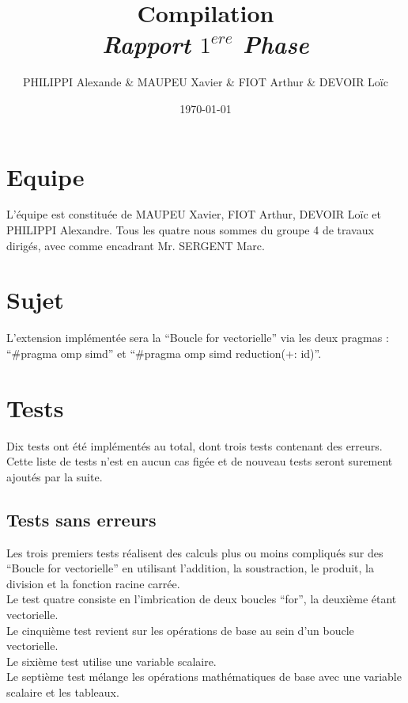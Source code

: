 \documentclass[a4paper,8pt,french,fleqn]{report}
\title{\textbf{Compilation}\\\textit{Rapport $1^{ere}$ Phase}}
\author{PHILIPPI Alexande \& MAUPEU Xavier \& FIOT Arthur \& DEVOIR Loïc}
\date{\today}
\begin{document}
\maketitle

\newpage

\section*{Equipe}

L'équipe est constituée de MAUPEU Xavier, FIOT Arthur, DEVOIR Loïc et PHILIPPI Alexandre. Tous les quatre nous sommes du groupe 4 de travaux dirigés, avec comme encadrant Mr. SERGENT Marc.

\section*{Sujet}

L'extension implémentée sera la ``Boucle for vectorielle'' via les deux pragmas : ``\#pragma omp simd'' et ``\#pragma omp simd reduction(+: id)''.

\section*{Tests}

Dix tests ont été implémentés au total, dont trois tests contenant des erreurs. Cette liste de tests n'est en aucun cas figée et de nouveau tests seront surement ajoutés par la suite.

\subsection*{Tests sans erreurs}

Les trois premiers tests réalisent des calculs plus ou moins compliqués sur des ``Boucle for vectorielle'' en utilisant l'addition, la soustraction, le produit, la division et la fonction racine carrée. \\

Le test quatre consiste en l'imbrication de deux boucles ``for'', la deuxième étant vectorielle. \\

Le cinquième test revient sur les opérations de base au sein d'un boucle vectorielle. \\

Le sixième test utilise une variable scalaire. \\

Le septième test mélange les opérations mathématiques de base avec une variable scalaire et les tableaux. \\
\end{document}
